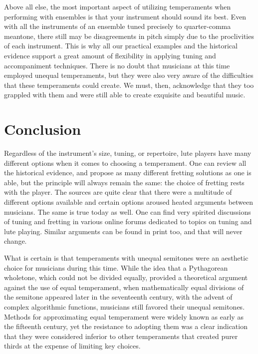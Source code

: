 Above all else, the most important aspect of utilizing temperaments when performing with ensembles
is that your instrument should sound its best. Even with all the instruments of an ensemble tuned
precisely to quarter-comma meantone, there still may be disagreements in pitch simply due to the
proclivities of each instrument. This is why all our practical examples and the historical evidence
support a great amount of flexibility in applying tuning and accompaniment techniques. There is no
doubt that musicians at this time employed unequal temperaments, but they were also very aware of
the difficulties that these temperaments could create.  We must, then, acknowledge that they too
grappled with them and were still able to create exquisite and beautiful music.

\section{Conclusion}

Regardless of the instrument's size, tuning, or repertoire, lute players have many different options
when it comes to choosing a temperament.  One can review all the historical evidence, and propose as
many different fretting solutions as one is able, but the principle will always remain the same: the
choice of fretting rests with the player. The sources are quite clear that there were a
multitude of different options available and certain options aroused heated arguments between
musicians. The same is true today as well. One can find very spirited discussions of tuning and
fretting in various online forums dedicated to topics on tuning and lute playing. Similar arguments
can be found in print too, and that will never change. \autocite{DD:4}

What is certain is that temperaments with unequal semitones were an aesthetic choice for musicians
during this time.  While the idea that a Pythagorean wholetone, which could not be divided equally,
provided a theoretical argument against the use of equal temperament, when mathematically equal
divisions of the semitone appeared later in the seventeenth century, with the advent of complex
algorithmic functions, musicians still favored their unequal semitones.  Methods for approximating
equal temperament were widely known as early as the fifteenth century, yet the resistance to
adopting them was a clear indication that they were considered inferior to other temperaments that
created purer thirds at the expense of limiting key choices.

